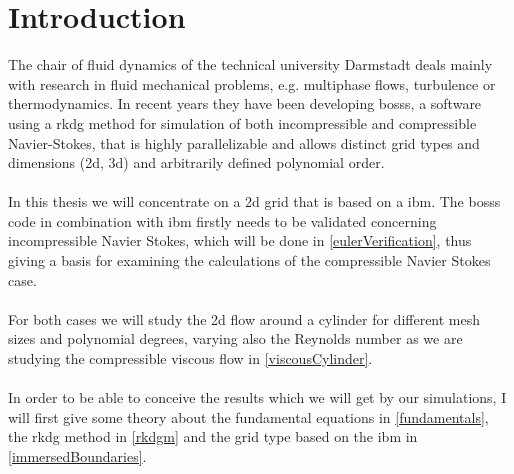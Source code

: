 \chapter{Introduction}
The chair of fluid dynamics of the technical university Darmstadt deals mainly with research in fluid mechanical problems, e.g. multiphase flows, turbulence or thermodynamics. In recent years they have been developing \gls{bosss}, a  software using a \gls{rkdg} method for simulation of both incompressible and compressible Navier-Stokes, that is highly parallelizable and allows distinct grid types and dimensions (\gls{2d}, \gls{3d}) and arbitrarily defined polynomial order. \\\\
In this thesis we will concentrate on a \gls{2d} grid that is based on a \gls{ibm}. The \gls{bosss} code in combination with \gls{ibm} firstly needs to be validated concerning incompressible Navier Stokes, which will be done in \ref{eulerVerification}, thus giving a basis for examining the calculations of the compressible Navier Stokes case. \\\\
For both cases we will study the \gls{2d} flow around a cylinder for different mesh sizes and polynomial degrees, varying also the Reynolds number as we are studying the compressible viscous flow in \ref{viscousCylinder}. \\\\
In order to be able to conceive the results which we will get by our simulations, I will first give some theory about the fundamental equations in \ref{fundamentals}, the \gls{rkdg} method in \ref{rkdgm} and the grid type based on the \gls{ibm} in \ref{immersedBoundaries}.
